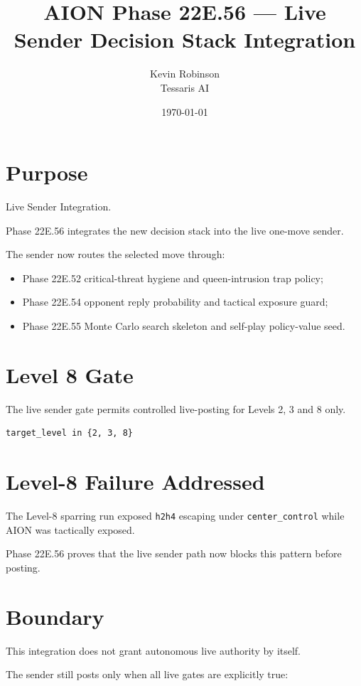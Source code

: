 \documentclass[11pt,a4paper]{article}
\title{\textbf{AION Phase 22E.56 --- Live Sender Decision Stack Integration}}
\author{Kevin Robinson\\Tessaris AI}
\date{\today}
\begin{document}
\maketitle

\section{Purpose}

Live Sender Integration.

Phase 22E.56 integrates the new decision stack into the live one-move sender.

The sender now routes the selected move through:

\begin{itemize}
  \item Phase 22E.52 critical-threat hygiene and queen-intrusion trap policy;
  \item Phase 22E.54 opponent reply probability and tactical exposure guard;
  \item Phase 22E.55 Monte Carlo search skeleton and self-play policy-value seed.
\end{itemize}

\section{Level 8 Gate}

The live sender gate permits controlled live-posting for Levels 2, 3 and 8 only.

\begin{verbatim}
target_level in {2, 3, 8}
\end{verbatim}

\section{Level-8 Failure Addressed}

The Level-8 sparring run exposed \texttt{h2h4} escaping under \texttt{center\_control} while AION was tactically exposed.

Phase 22E.56 proves that the live sender path now blocks this pattern before posting.

\section{Boundary}

This integration does not grant autonomous live authority by itself.

The sender still posts only when all live gates are explicitly true:
\end{document}
